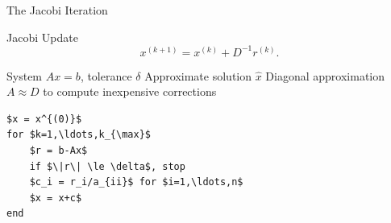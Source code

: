 \documentclass[10pt]{beamer}
\begin{document}


\begin{frame}[fragile]{The Jacobi Iteration}

\begin{block}{Jacobi Update}
\[
    x^{(k+1)}=x^{(k)}+D^{-1}r^{(k)}.
\]
\end{block}

{
{System $Ax=b$, tolerance $\delta$}
{Approximate solution $\hat{x}$}
{Diagonal approximation $A\approx D$ to compute inexpensive corrections}
}

\begin{lstlisting}[mathescape]
$x = x^{(0)}$
for $k=1,\ldots,k_{\max}$
    $r = b-Ax$
    if $\|r\| \le \delta$, stop
    $c_i = r_i/a_{ii}$ for $i=1,\ldots,n$
    $x = x+c$
end
\end{lstlisting}


\end{frame}

\end{document}
